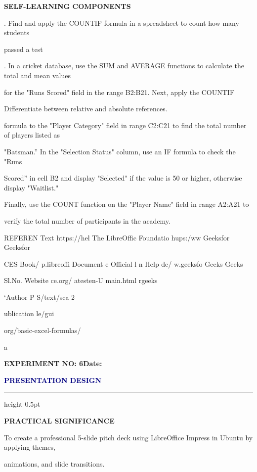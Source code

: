 \documentclass[10pt,a4paper]{article}
\newcommand{\expheading}[2]{%
  \vspace{0.1cm}\noindent\textbf{\large EXPERIMENT NO: #1}\hfill\textbf{Date: #2}\par
}
\newcommand{\exptitle}[1]{%
  \begin{center}\vspace{-2mm}\textcolor{navy}{\fontsize{20}{22}\selectfont\bfseries #1}\end{center}
  \vspace{1mm}\hrule height 0.5pt\vspace{3mm}
}
\begin{document}
\medskip\noindent\textbf{SELF-LEARNING COMPONENTS}\par
{}. Find and apply the COUNTIF formula in a spreadsheet to count how many students\par
\noindent passed a test\par
{}. In a cricket database, use the SUM and AVERAGE functions to calculate the total and mean values\par
\noindent for the "Runs Scored" field in the range B2:B21. Next, apply the COUNTIF\par
\noindent Differentiate between relative and absolute references.\par
\noindent formula to the "Player Category" field in range C2:C21 to find the total number of players listed as\par
\noindent "Batsman.” In the "Selection Status" column, use an IF formula to check the "Runs\par
\noindent Scored” in cell B2 and display "Selected" if the value is 50 or higher, otherwise display "Waitlist."\par
\noindent Finally, use the COUNT function on the "Player Name" field in range A2:A21 to\par
\noindent verify the total number of participants in the academy.\par

\noindent REFEREN     Text         https://hel   The        LibreOffic     Foundatio    hups:/ww    Geeksfor   Geeksfor\par
\noindent CES         Book/        p.libreoffi   Document   e Official l   n Help de/   w.geeksfo   Geeks      Geeks\par
\noindent Sl.No.      Website      ce.org/                  atesten-U      main.html    rgeeks\par
\noindent ‘Author P                             S/text/sca     2\par
\noindent ublication                            le/gui\par
{}\par

\noindent org/basic-excel-formulas/\par
\noindent a\par
\clearpage
\expheading{6}{\underline{\hspace{1.8cm}}}
\exptitle{PRESENTATION DESIGN}
\medskip\noindent\textbf{PRACTICAL SIGNIFICANCE}\par
\noindent To create a professional 5-slide pitch deck using LibreOffice Impress in Ubuntu by applying themes,\par
\noindent animations, and slide transitions.\par
\end{document}
